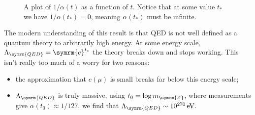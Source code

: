 \documentclass[fleqn]{NotesClass}
\newcommand{\PZboson}{\ensuremath{\symrm{Z}}}
\newcommand{\e}{\symrm{e}}
\begin{document}
    \begin{figure}
        \caption{A plot of \(1/\alpha(t)\) as a function of \(t\). Notice that at some value \(t_*\) we have \(1/\alpha(t_*) = 0\), meaning \(\alpha(t_*)\) must be infinite.}
        \label{fig:fine structure constant plot}
    \end{figure}
    
    The modern understanding of this result is that QED is not well defined as a quantum theory to arbitrarily high energy.
    At some energy scale, \(\Lambda_{\symrm{QED}} = \e^{t_*}\) the theory breaks down and stops working.
    This isn't really too much of a worry for two reasons:
    \begin{itemize}
        \item the approximation that \(e(\mu)\) is small breaks far below this energy scale;
        \item \(\Lambda_{\symrm{QED}}\) is truly massive, using \(t_0 = \log m_{\PZboson}\), where measurements give \(\alpha(t_0) \approx 1/127\), we find that \(\Lambda_{\symrm{QED}} \sim 10^{270} \, \unit{\electronvolt}\).
    \end{itemize}
    
\end{document}
